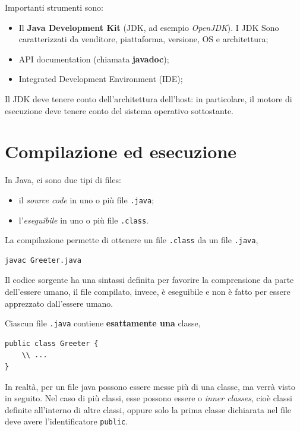 \documentclass[\fontsizeclass,twocolumn]{\classname}
\theoremstyle{definition}
\theoremstyle{definition}
\begin{document}
Importanti strumenti sono:

\begin{itemize}
    \item Il \textbf{Java Development Kit} (JDK, ad esempio \emph{OpenJDK}).
        I JDK Sono caratterizzati da venditore, piattaforma, versione, OS e
        architettura;
	\item API documentation (chiamata \textbf{javadoc});
	\item Integrated Development Environment (IDE);
\end{itemize}

Il JDK deve tenere conto dell'architettura dell'host: in particolare, il motore
di esecuzione deve tenere conto del sistema operativo sottostante.

\section{Compilazione ed esecuzione}

In Java, ci sono due tipi di files:

\begin{itemize}
	\item il \emph{source code} in uno o più file \texttt{.java};
	\item l'\emph{eseguibile} in uno o più file \texttt{.class}.
\end{itemize}

La compilazione permette di ottenere un file \texttt{.class} da un file
\texttt{.java},


\begin{lstlisting}
javac Greeter.java
\end{lstlisting}

Il codice sorgente ha una sintassi definita per favorire la comprensione da
parte dell'essere umano, il file compilato, invece, è eseguibile e non è fatto
per essere apprezzato dall'essere umano.

Ciascun file \texttt{.java} contiene \textbf{esattamente una} classe,

\begin{lstlisting}
public class Greeter {
	\\ ...
}
\end{lstlisting}

In realtà, per un file java possono essere messe più di una classe, ma verrà
visto in seguito. Nel caso di più classi, esse possono essere o \emph{inner
classes}, cioè classi definite all'interno di altre classi, oppure solo la
prima classe dichiarata nel file deve avere l'identificatore \texttt{public}.
\end{document}
